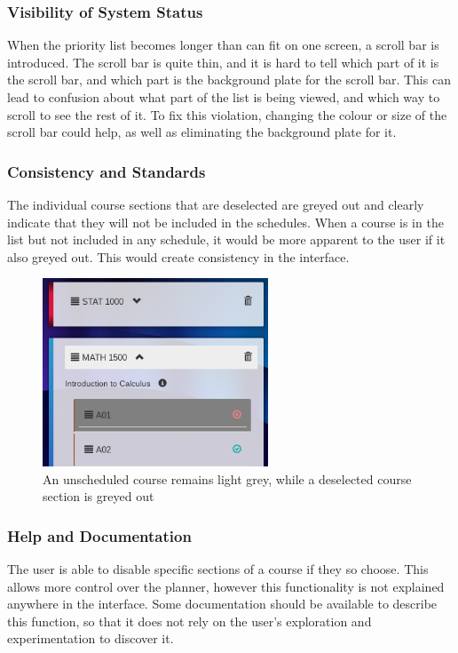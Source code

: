 \documentclass{article}
\begin{document}
\subsubsection{Visibility of System Status}
When the priority list becomes longer than can fit on one screen, a scroll bar is introduced. The scroll bar is quite thin, and it is hard to tell which part of it is the scroll bar, and which part is the background plate for the scroll bar. This can lead to confusion about what part of the list is being viewed, and which way to scroll to see the rest of it. To fix this violation, changing the colour or size of the scroll bar could help, as well as eliminating the background plate for it.

\subsubsection{Consistency and Standards}
The individual course sections that are deselected are greyed out and clearly indicate that they will not be included in the schedules. When a course is in the list but not included in any schedule, it would be more apparent to the user if it also greyed out. This would create consistency in the interface.

\begin{figure}[h!]
    \centering
    \includegraphics[width=0.6\textwidth]{deselectedSection.png}

    \caption{An unscheduled course remains light grey, while a deselected course section is greyed out}
    \label{fig:deselectedCard}
\end{figure}



\subsubsection{Help and Documentation}
The user is able to disable specific sections of a course if they so choose. This allows more control over the planner, however this functionality is not explained anywhere in the interface. Some documentation should be available to describe this function, so that it does not rely on the user's exploration and experimentation to discover it.
\end{document}
